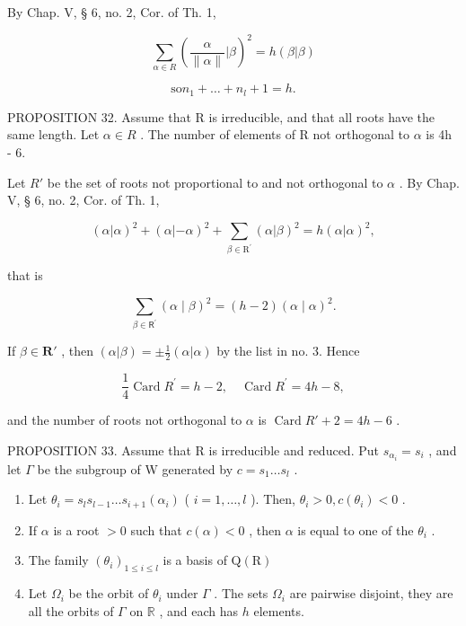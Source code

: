 By Chap. V, § 6, no. 2, Cor. of Th. 1,

\[
\sum_ {\alpha \in R} \left(\frac {\alpha}{\| \alpha \|} | \beta\right) ^ {2} = h (\beta | \beta)
\]

\[
\mathrm{so} n _ {1} + \dots + n _ {l} + 1 = h.
\]

PROPOSITION 32. Assume that R is irreducible, and that all roots have the same length. Let \(\alpha \in R\) . The number of elements of R not orthogonal to \(\alpha\) is 4h - 6.

Let \(R'\) be the set of roots not proportional to and not orthogonal to \(\alpha\) . By Chap. V, § 6, no. 2, Cor. of Th. 1,

\[
(\alpha | \alpha) ^ {2} + (\alpha | - \alpha) ^ {2} + \sum_ {\beta \in \mathrm{R} ^ {\prime}} (\alpha | \beta) ^ {2} = h (\alpha | \alpha) ^ {2},
\]

that is

\[
\sum_ {\beta \in \mathsf {R} ^ {\prime}} (\alpha \mid \beta) ^ {2} = (h - 2) (\alpha \mid \alpha) ^ {2}.
\]

If \(\beta \in \mathbf{R}'\) , then \((\alpha | \beta) = \pm \frac{1}{2} (\alpha | \alpha)\) by the list in no. 3. Hence

\[
\frac {1}{4} \operatorname{Card} R ^ {\prime} = h - 2, \quad \operatorname{Card} R ^ {\prime} = 4 h - 8,
\]

and the number of roots not orthogonal to \(\alpha\) is \(\operatorname{Card} R' + 2 = 4h - 6\) .

PROPOSITION 33. Assume that R is irreducible and reduced. Put \(s_{\alpha_i} = s_i\) , and let \(\Gamma\) be the subgroup of W generated by \(c = s_1 \ldots s_l\) .

\begin{enumerate}
\def\labelenumi{(\roman{enumi})}
\item
  Let \(\theta_{i} = s_{l}s_{l - 1}\dots s_{i + 1}(\alpha_{i})\) ( \(i = 1,\dots ,l\) ). Then, \(\theta_{i} > 0,c(\theta_{i}) < 0\) .
\item
  If \(\alpha\) is a root \(>0\) such that \(c(\alpha) < 0\) , then \(\alpha\) is equal to one of the \(\theta_{i}\) .
\item
  The family \((\theta_{i})_{1\leqslant i\leqslant l}\) is a basis of \(\mathrm{Q}(\mathrm{R})\)
\item
  Let \(\Omega_{i}\) be the orbit of \(\theta_{i}\) under \(\Gamma\) . The sets \(\Omega_{i}\) are pairwise disjoint, they are all the orbits of \(\Gamma\) on \(\mathbb{R}\) , and each has \(h\) elements.
\end{enumerate}

